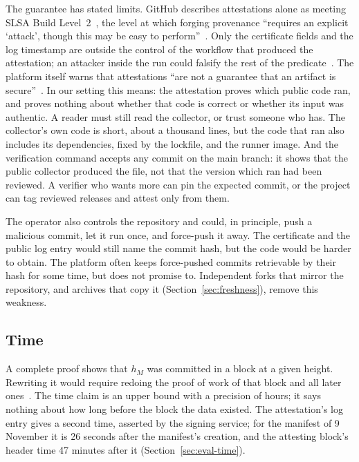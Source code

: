 The guarantee has stated limits. GitHub describes attestations alone as meeting SLSA Build Level~2~\citep{github-attestations}, the level at which forging provenance ``requires an explicit `attack', though this may be easy to perform''~\citep{slsa12}. Only the certificate fields and the log timestamp are outside the control of the workflow that produced the attestation; an attacker inside the run could falsify the rest of the predicate~\citep{gh-attestation-verify}. The platform itself warns that attestations ``are not a guarantee that an artifact is secure''~\citep{github-attestations}. In our setting this means: the attestation proves which public code ran, and proves nothing about whether that code is correct or whether its input was authentic. A reader must still read the collector, or trust someone who has. The collector's own code is short, about a thousand lines, but the code that ran also includes its dependencies, fixed by the lockfile, and the runner image. And the verification command accepts any commit on the main branch: it shows that the public collector produced the file, not that the version which ran had been reviewed. A verifier who wants more can pin the expected commit, or the project can tag reviewed releases and attest only from them.

The operator also controls the repository and could, in principle, push a malicious commit, let it run once, and force-push it away. The certificate and the public log entry would still name the commit hash, but the code would be harder to obtain. The platform often keeps force-pushed commits retrievable by their hash for some time, but does not promise to. Independent forks that mirror the repository, and archives that copy it (Section~\ref{sec:freshness}), remove this weakness.

\subsection{Time}

A complete proof shows that $h_M$ was committed in a block at a given height. Rewriting it would require redoing the proof of work of that block and all later ones~\citep{nakamoto2008bitcoin}. The time claim is an upper bound with a precision of hours; it says nothing about how long before the block the data existed. The attestation's log entry gives a second time, asserted by the signing service; for the manifest of 9 November it is 26 seconds after the manifest's creation, and the attesting block's header time 47 minutes after it (Section~\ref{sec:eval-time}).

